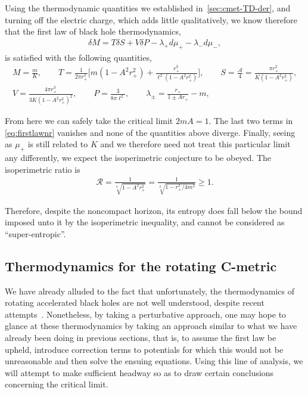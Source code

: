 \documentclass[
twoside,
openright,
frontopenright,
]{dmathesis}
\newcommand{\nn}{\nonumber}
\begin{document}
Using the thermodynamic quantities we established in~\cref{sec:cmet-TD-der}, and
turning off the electric charge, which adds little qualitatively, we know
therefore that the first law of black hole thermodynamics,
\begin{align}\label{eq:firstlawnr}
  \delta M = T\delta S + V\delta P - \lambda_+ d\mu_+ - \lambda_- d\mu_-,
\end{align}
is satisfied with the following quantities,
\begin{gather}
  M=\frac{m}{K},\qquad T=\frac{1}{2\pi
    r_+^2}\bigg[m(1-A^2 r_+^2) + \frac{r_+^3}{\ell^2(1-A^2 r_+^2)}\bigg], \qquad
  S=\frac{\mathcal{A}}{4} = \frac{\pi r_+^2}{K(1- A^2 r_+^2)},\nn\\ 
  V=\frac{4 \pi  r_+^3}{3 K (1- A^2 r_+^2)^2}, \qquad P=\frac{3}{8\pi \ell^2},
  \qquad \lambda_\pm = \frac{r_+}{1\pm A r_+} - m,
\end{gather}

From here we can safely take the critical limit $2mA = 1$. The last two terms in
\cref{eq:firstlawnr} vanishes and none of the quantities above diverge. Finally,
seeing as $\mu_+$ is still related to $K$ and we therefore need not treat this
particular limit any differently, we expect the isoperimetric
conjecture to be obeyed. The isoperimetric ratio is
\begin{align}
  \mathcal{R} =\frac{1}{\sqrt[6~]{1-A^2r_+^2}} =
  \frac{1}{\sqrt[6~]{1-r_+^2/4m^2}}\geqslant 1. 
\end{align}

Therefore, despite the noncompact horizon, its entropy does fall below the bound
imposed unto it by the isoperimetric inequality, and cannot be considered as
``super-entropic''.

\subsection{Thermodynamics for the rotating C-metric}
\label{sec:therm-rotat-c}

We have already alluded to the fact that unfortunately, the thermodynamics of
rotating accelerated black holes are not well understood, despite recent
attempts~\cite{Astorino:2016ybm}. Nonetheless, by taking a perturbative
approach, one may hope to glance at these thermodynamics by taking an approach
similar to what we have already been doing in previous sections, that is, to
assume the first law be upheld, introduce correction terms to potentials for
which this would not be unreasonable and then solve the ensuing equations. Using
this line of analysis, we will attempt to make sufficient headway so as to draw
certain conclusions concerning the critical limit.
\end{document}
